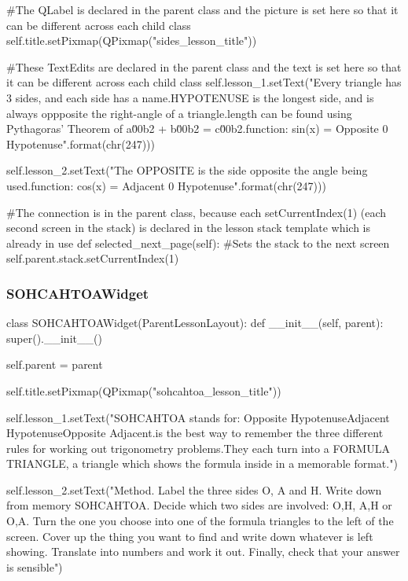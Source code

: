 \begin{landscape}
\begin{python}
        #The QLabel is declared in the parent class and the picture is set here so that it can be different across each child class
        self.title.setPixmap(QPixmap("sides_lesson_title"))

        #These TextEdits are declared in the parent class and the text is set here so that it can be different across each child class
        self.lesson_1.setText("Every triangle has 3 sides, and each side has a name.\nThe HYPOTENUSE is the longest side, and is always oppposite the right-angle of a triangle.\nThe length can be found using Pythagoras' Theorem of a\u00b2 + b\u00b2 = c\u00b2.\nSine function: sin(x) = Opposite {0} Hypotenuse".format(chr(247)))

        self.lesson_2.setText("The OPPOSITE is the side opposite the angle being used.\nCosine function: cos(x) = Adjacent {0} Hypotenuse".format(chr(247)))

    #The connection is in the parent class, because each setCurrentIndex(1) (each second screen in the stack) is declared in the lesson stack template which is already in use
    def selected_next_page(self):
        #Sets the stack to the next screen
        self.parent.stack.setCurrentIndex(1)
\end{python}

\subsubsection{SOHCAHTOAWidget}

\begin{python}
class SOHCAHTOAWidget(ParentLessonLayout):
    def __init__(self, parent):
        super().__init__()

        self.parent = parent
        
        self.title.setPixmap(QPixmap("sohcahtoa_lesson_title"))
        
        self.lesson_1.setText("SOHCAHTOA stands for: \nSine Opposite Hypotenuse\nCosine Adjacent Hypotenuse\nTan Opposite Adjacent.\nThis is the best way to remember the three different rules for working out trigonometry problems.They each turn into a FORMULA TRIANGLE, a triangle which shows the formula inside in a memorable format.")

        self.lesson_2.setText("Method. Label the three sides O, A and H. Write down from memory SOHCAHTOA. Decide which two sides are involved: O,H, A,H or O,A. Turn the one you choose into one of the formula triangles to the left of the screen. Cover up the thing you want to find and write down whatever is left showing. Translate into numbers and work it out. Finally, check that your answer is sensible")


\end{python}
\end{landscape}
